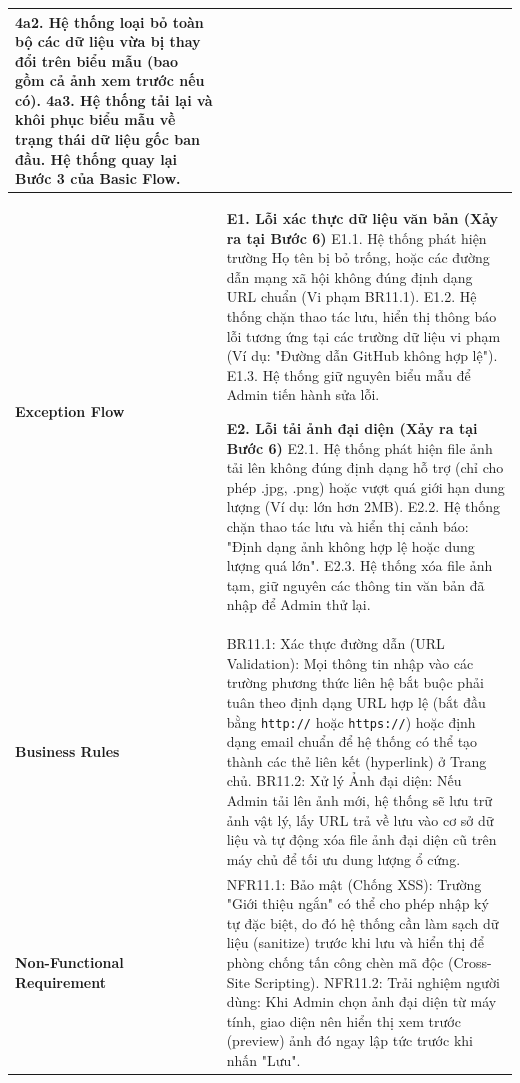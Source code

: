 \documentclass[a4paper,12pt]{article}
\begin{document}
\begin{longtable}{|p{4cm}|p{11.5cm}|}
4a2. Hệ thống loại bỏ toàn bộ các dữ liệu vừa bị thay đổi trên biểu mẫu (bao gồm cả ảnh xem trước nếu có). \newline
4a3. Hệ thống tải lại và khôi phục biểu mẫu về trạng thái dữ liệu gốc ban đầu. \newline
Hệ thống quay lại Bước 3 của Basic Flow. \\ \hline
\textbf{Exception Flow} & 
\textbf{E1. Lỗi xác thực dữ liệu văn bản (Xảy ra tại Bước 6)} \newline
E1.1. Hệ thống phát hiện trường Họ tên bị bỏ trống, hoặc các đường dẫn mạng xã hội không đúng định dạng URL chuẩn (Vi phạm BR11.1). \newline
E1.2. Hệ thống chặn thao tác lưu, hiển thị thông báo lỗi tương ứng tại các trường dữ liệu vi phạm (Ví dụ: "Đường dẫn GitHub không hợp lệ"). \newline
E1.3. Hệ thống giữ nguyên biểu mẫu để Admin tiến hành sửa lỗi. \newline

\textbf{E2. Lỗi tải ảnh đại diện (Xảy ra tại Bước 6)} \newline
E2.1. Hệ thống phát hiện file ảnh tải lên không đúng định dạng hỗ trợ (chỉ cho phép .jpg, .png) hoặc vượt quá giới hạn dung lượng (Ví dụ: lớn hơn 2MB). \newline
E2.2. Hệ thống chặn thao tác lưu và hiển thị cảnh báo: "Định dạng ảnh không hợp lệ hoặc dung lượng quá lớn". \newline
E2.3. Hệ thống xóa file ảnh tạm, giữ nguyên các thông tin văn bản đã nhập để Admin thử lại. \\ \hline
\textbf{Business Rules} & 
BR11.1: Xác thực đường dẫn (URL Validation): Mọi thông tin nhập vào các trường phương thức liên hệ bắt buộc phải tuân theo định dạng URL hợp lệ (bắt đầu bằng \texttt{http://} hoặc \texttt{https://}) hoặc định dạng email chuẩn để hệ thống có thể tạo thành các thẻ liên kết (hyperlink) ở Trang chủ. \newline
BR11.2: Xử lý Ảnh đại diện: Nếu Admin tải lên ảnh mới, hệ thống sẽ lưu trữ ảnh vật lý, lấy URL trả về lưu vào cơ sở dữ liệu và tự động xóa file ảnh đại diện cũ trên máy chủ để tối ưu dung lượng ổ cứng. \\ \hline
\textbf{Non-Functional Requirement} & 
NFR11.1: Bảo mật (Chống XSS): Trường "Giới thiệu ngắn" có thể cho phép nhập ký tự đặc biệt, do đó hệ thống cần làm sạch dữ liệu (sanitize) trước khi lưu và hiển thị để phòng chống tấn công chèn mã độc (Cross-Site Scripting). \newline
NFR11.2: Trải nghiệm người dùng: Khi Admin chọn ảnh đại diện từ máy tính, giao diện nên hiển thị xem trước (preview) ảnh đó ngay lập tức trước khi nhấn "Lưu". \\ \hline
\end{longtable}
\end{document}
